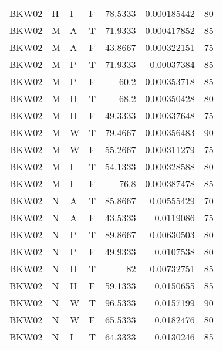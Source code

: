 \begin{longtable}{llllrrr}
    BKW02    & H         & I         & F          & 78.5333    & 0.000185442 & 80       \\
    BKW02    & M         & A         & T          & 71.9333    & 0.000417852 & 85       \\
    BKW02    & M         & A         & F          & 43.8667    & 0.000322151 & 75       \\
    BKW02    & M         & P         & T          & 71.9333    & 0.00037384  & 85       \\
    BKW02    & M         & P         & F          & 60.2       & 0.000353718 & 85       \\
    BKW02    & M         & H         & T          & 68.2       & 0.000350428 & 80       \\
    BKW02    & M         & H         & F          & 49.3333    & 0.000337648 & 75       \\
    BKW02    & M         & W         & T          & 79.4667    & 0.000356483 & 90       \\
    BKW02    & M         & W         & F          & 55.2667    & 0.000311279 & 75       \\
    BKW02    & M         & I         & T          & 54.1333    & 0.000328588 & 80       \\
    BKW02    & M         & I         & F          & 76.8       & 0.000387478 & 85       \\
    BKW02    & N         & A         & T          & 85.8667    & 0.00555429  & 70       \\
    BKW02    & N         & A         & F          & 43.5333    & 0.0119086   & 75       \\
    BKW02    & N         & P         & T          & 89.8667    & 0.00630503  & 80       \\
    BKW02    & N         & P         & F          & 49.9333    & 0.0107538   & 80       \\
    BKW02    & N         & H         & T          & 82         & 0.00732751  & 85       \\
    BKW02    & N         & H         & F          & 59.1333    & 0.0150655   & 85       \\
    BKW02    & N         & W         & T          & 96.5333    & 0.0157199   & 90       \\
    BKW02    & N         & W         & F          & 65.5333    & 0.0182476   & 80       \\
    BKW02    & N         & I         & T          & 64.3333    & 0.0130246   & 85       \\

\end{longtable}
